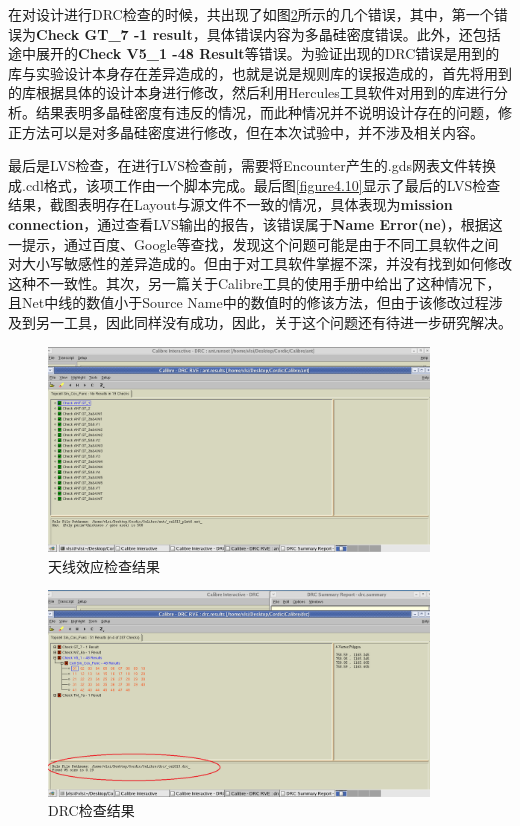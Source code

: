 \documentclass[a4paper,12pt]{report}
\begin{document}
在对设计进行DRC检查的时候，共出现了如图\ref{figure4.9}所示的几个错误，其中，第一个错误为\textbf{Check GT\_7 -1 result}，具体错误内容为多晶硅密度错误。此外，还包括途中展开的\textbf{Check V5\_1 -48 Result}等错误。为验证出现的DRC错误是用到的库与实验设计本身存在差异造成的，也就是说是规则库的误报造成的，首先将用到的库根据具体的设计本身进行修改，然后利用Hercules工具软件对用到的库进行分析。结果表明多晶硅密度有违反的情况，而此种情况并不说明设计存在的问题，修正方法可以是对多晶硅密度进行修改，但在本次试验中，并不涉及相关内容。

最后是LVS检查，在进行LVS检查前，需要将Encounter产生的.gds网表文件转换成.cdl格式，该项工作由一个脚本完成。最后图\ref{figure4.10}显示了最后的LVS检查结果，截图表明存在Layout与源文件不一致的情况，具体表现为\textbf{mission connection}，通过查看LVS输出的报告，该错误属于\textbf{Name Error(ne)}，根据这一提示，通过百度、Google等查找，发现这个问题可能是由于不同工具软件之间对大小写敏感性的差异造成的。但由于对工具软件掌握不深，并没有找到如何修改这种不一致性。其次，另一篇关于Calibre工具的使用手册中给出了这种情况下，且Net中线的数值小于Source Name中的数值时的修该方法，但由于该修改过程涉及到另一工具，因此同样没有成功，因此，关于这个问题还有待进一步研究解决。

\begin{figure}[!hbtp]
\centering
\includegraphics[width=0.9\textwidth]{ANT1}
\caption{天线效应检查结果}
\label{figure4.8}
\end{figure}


\begin{figure}[!hbtp]
\centering
\includegraphics[width=0.9\textwidth]{DRC1}
\caption{DRC检查结果}
\label{figure4.9}
\end{figure}
\end{document}
